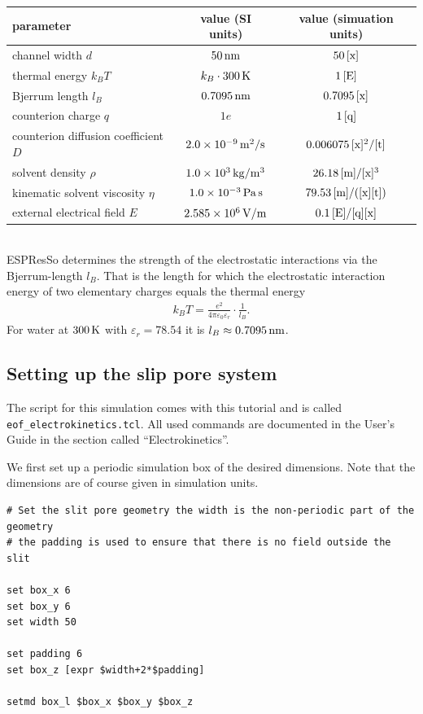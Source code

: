 \begin{tabular}[h]{|l|c|c|}
\hline
parameter & value (SI units) & value (simuation units)\\
\hline\hline
channel width $d$ & $50\,\mathrm{nm}$ & $50\,\mathrm{[x]}$\\
\hline
thermal energy $k_B T$ & $k_B\cdot300\,\mathrm{K}$ & $1\,\mathrm{[E]}$\\
\hline
Bjerrum length $l_B$ & $0.7095\,\mathrm{nm}$ & $0.7095\,\mathrm{[x]}$\\
\hline
counterion charge $q$ & $1e$ & $1\,\mathrm{[q]}$\\
\hline
counterion diffusion coefficient $D$ & $2.0\times 10^{-9}\,\mathrm{m^2/s}$ & $0.006075\,\mathrm{[x]^2/[t]}$\\
\hline
solvent density $\rho$ & $1.0\times 10^{3}\,\mathrm{kg/m^3}$ & $26.18\,\mathrm{[m]/[x]^3}$\\
\hline
kinematic solvent viscosity $\eta$ & $1.0\times 10^{-3}\,\mathrm{Pa}\,\mathrm{s}$ & $79.53\,\mathrm{[m]/([x][t])}$\\
\hline
external electrical field $E$ & $2.585\times 10^{6}\,\mathrm{V/m}$ & $0.1\,\mathrm{[E]/[q][x]}$\\
\hline
\end{tabular}
\\

ESPResSo determines the strength of the electrostatic interactions via the Bjerrum-length $l_B$. That is the length for which the electrostatic interaction energy of two elementary charges equals the thermal energy
%
\begin{align*}
k_B T=\frac{e^2}{4\pi\varepsilon_0\varepsilon_r}\cdot\frac 1 {l_B}.
\end{align*}
%
For water at $300\,\mathrm{K}$ with $\varepsilon_r = 78.54$ it is $l_B\approx0.7095\,\mathrm{nm}$.


\subsection{Setting up the slip pore system}

The script for this simulation comes with this tutorial and is called \texttt{eof\_electrokinetics.tcl}. All used commands are documented in the User's Guide in the section called ``Electrokinetics''.

We first set up a periodic simulation box of the desired dimensions. Note that the dimensions are of course given in simulation units.

\begin{lstlisting}
# Set the slit pore geometry the width is the non-periodic part of the geometry
# the padding is used to ensure that there is no field outside the slit

set box_x 6
set box_y 6
set width 50

set padding 6
set box_z [expr $width+2*$padding]

setmd box_l $box_x $box_y $box_z
\end{lstlisting}

